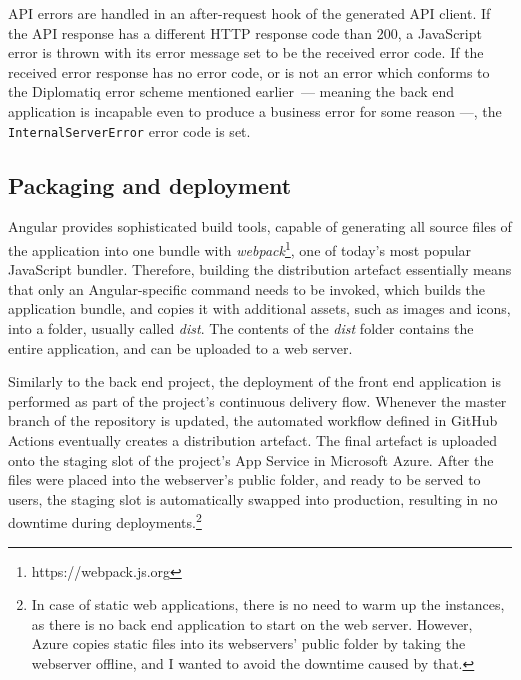 API errors are handled in an after-request hook of the generated API client. If the API response has a different HTTP response code than 200, a JavaScript error is thrown with its error message set to be the received error code. If the received error response has no error code, or is not an error which conforms to the Diplomatiq error scheme mentioned earlier — meaning the back end application is incapable even to produce a business error for some reason —, the \lstinline{InternalServerError} error code is set.

\subsection{Packaging and deployment}

Angular provides sophisticated build tools, capable of generating all source files of the application into one bundle with \emph{webpack}\footnote{https://webpack.js.org}, one of today's most popular JavaScript bundler. Therefore, building the distribution artefact essentially means that only an Angular-specific command needs to be invoked, which builds the application bundle, and copies it with additional assets, such as images and icons, into a folder, usually called \emph{dist}. The contents of the \emph{dist} folder contains the entire application, and can be uploaded to a web server.

Similarly to the back end project, the deployment of the front end application is performed as part of the project’s continuous delivery flow. Whenever the master branch of the repository is updated, the automated workflow defined in GitHub Actions eventually creates a distribution artefact. The final artefact is uploaded onto the staging slot of the project’s App Service in Microsoft Azure. After the files were placed into the webserver's public folder, and ready to be served to users, the staging slot is automatically swapped into production, resulting in no downtime during deployments.\footnote{In case of static web applications, there is no need to warm up the instances, as there is no back end application to start on the web server. However, Azure copies static files into its webservers' public folder by taking the webserver offline, and I wanted to avoid the downtime caused by that.}
